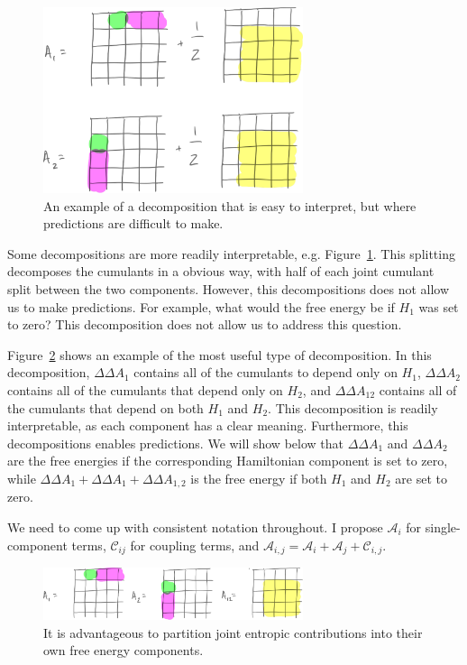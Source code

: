 \documentclass{article}
\begin{document}
\begin{figure}[tb]
\centering
\includegraphics[width=3in]{figure4.pdf}
\caption{An example of a decomposition that is easy to interpret, but where predictions are difficult to make.}
\label{fig:ok_split}
\end{figure}

Some decompositions are more readily interpretable, e.g. Figure~\ref{fig:ok_split}. This splitting decomposes the cumulants in a obvious way, with half of each joint cumulant split between the two components. However, this decompositions does not allow us to make predictions. For example, what would the free energy be if $H_1$ was set to zero? This decomposition does not allow us to address this question.


Figure~\ref{fig:good_split} shows an example of the most useful type of decomposition. In this decomposition, $\Delta\Delta A_1$ contains all of the cumulants to depend only on $H_1$, $\Delta\Delta A_2$ contains all of the cumulants that depend only on $H_2$, and $\Delta\Delta A_{12}$ contains all of the cumulants that depend on both $H_1$ and $H_2$. This decomposition is readily interpretable, as each component has a clear meaning. Furthermore, this decompositions enables predictions. We will show below that $\Delta\Delta A_1$ and $\Delta\Delta A_2$ are the free energies if the corresponding Hamiltonian component is set to zero, while $\Delta\Delta A_1 + \Delta\Delta A_1 + \Delta\Delta A_{1,2}$ is the free energy if both $H_1$ and $H_2$ are set to zero.

We need to come up with consistent notation throughout. I propose $\mathcal{A}_i$ for single-component terms, $\mathcal{C}_{ij}$ for coupling terms, and $\mathcal{A}_{i,j} = \mathcal{A}_i + \mathcal{A}_j + \mathcal{C}_{i,j}$.

\begin{figure}[tb]
\centering
\includegraphics[width=3in]{figure5.pdf}
\caption{It is advantageous to partition joint entropic contributions into their own free energy components.}
\label{fig:good_split}
\end{figure}
\end{document}
